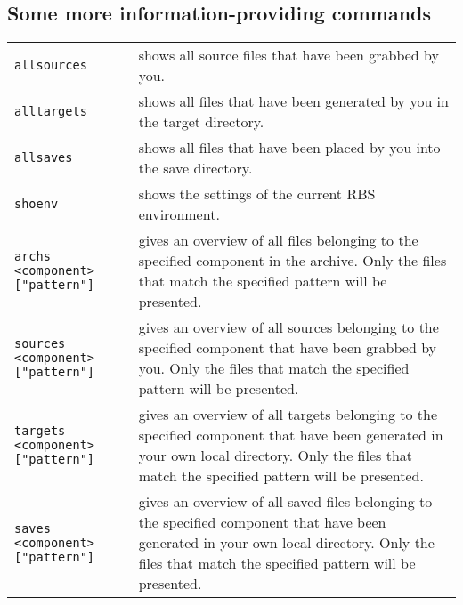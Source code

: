 \subsection{Some more information-providing commands}
\begin{tabular}{l p{7.7cm}}
\verb+allsources+                      & shows all source files that have been grabbed
                                  by you.\\
\verb+alltargets+                      & shows all files that have been generated
                                  by you in the target directory.\\

\verb+allsaves+                      & shows all files that have been placed
                                  by you into the save directory.\\

\verb+shoenv+                          & shows the settings of the current RBS
                                  environment.\\
\verb+archs <component> ["pattern"]+   & gives an overview of all files belonging to
                                  the specified component in the archive.
                                  Only the files that match the
                                  specified pattern will be presented.\\
\verb+sources <component> ["pattern"]+ & 
                                 gives an overview of all sources belonging to
                                  the specified component that have been
                                  grabbed by you. Only the files that match the
                                  specified pattern will be presented.\\
\verb+targets <component> ["pattern"]+ & gives an overview of all targets belonging to
                                  the specified component that have been
                                  generated in your own local directory. Only
                                  the files that match the specified pattern
                                  will be presented.\\
\verb+saves <component> ["pattern"]+ & gives an overview of all saved files 
                                  belonging to
                                  the specified component that have been
                                  generated in your own local directory. Only
                                  the files that match the specified pattern
                                  will be presented.\\
\end{tabular}
